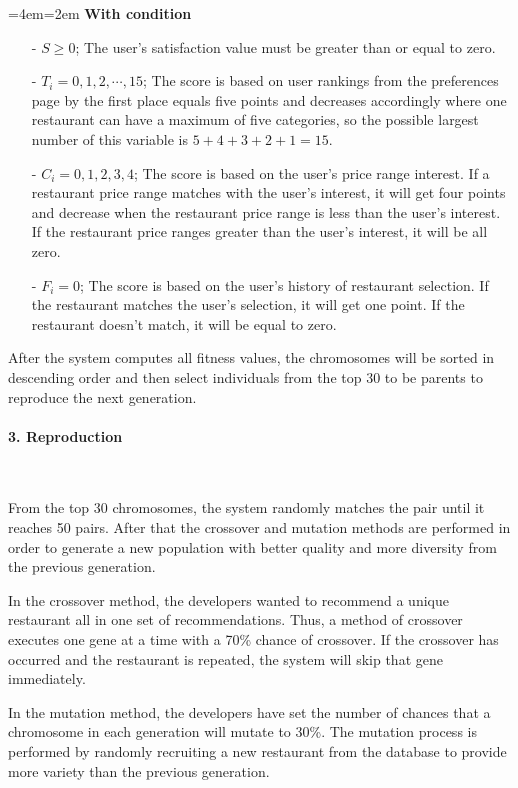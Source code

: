 \documentclass[12pt,oneside,openright,a4paper]{cpe-english-project}
\newenvironment{blockquote}{%
  \par%
  \medskip
  \leftskip=4em\rightskip=2em%
  \noindent\ignorespaces}{%
  \par\medskip}
\begin{document}
\begin{blockquote}
\textbf{With condition}
\vspace{-12pt}
\begin{itemize}\leftskip=2em
\item[-] $S \geq 0$; The user’s satisfaction value must be greater than or equal to zero.
\item[-] $T_i=0, 1, 2, \cdots, 15$; The score is based on user rankings from the preferences page by the first place equals five points and decreases accordingly where one restaurant can have a maximum of five categories, so the possible largest number of this variable is $5 + 4 + 3 + 2 + 1 = 15$.
\item[-] $C_i=0,1,2,3,4$; The score is based on the user’s price range interest. If a restaurant price range matches with the user’s interest, it will get four points and decrease when the restaurant price range is less than the user's interest. If the restaurant price ranges greater than the user's interest, it will be all zero.
\item[-] $F_i=0$; The score is based on the user’s history of restaurant selection. If the restaurant matches the user’s selection, it will get one point. If the restaurant doesn’t match, it will be equal to zero.
\end{itemize}
\end{blockquote}

After the system computes all fitness values, the chromosomes will be sorted in descending order and then select individuals from the top 30 to be parents to reproduce the next generation.

\paragraph*{3. Reproduction}\

From the top 30 chromosomes, the system randomly matches the pair until it reaches 50 pairs. After that the crossover and mutation methods are performed in order to generate a new population with better quality and more diversity from the previous generation.

In the crossover method, the developers wanted to recommend a unique restaurant all in one set of recommendations. Thus, a method of crossover executes one gene at a time with a 70\% chance of crossover. If the crossover has occurred and the restaurant is repeated, the system will skip that gene immediately.

In the mutation method, the developers have set the number of chances that a chromosome in each generation will mutate to 30\%. The mutation process is performed by randomly recruiting a new restaurant from the database to provide more variety than the previous generation.
\end{document}
